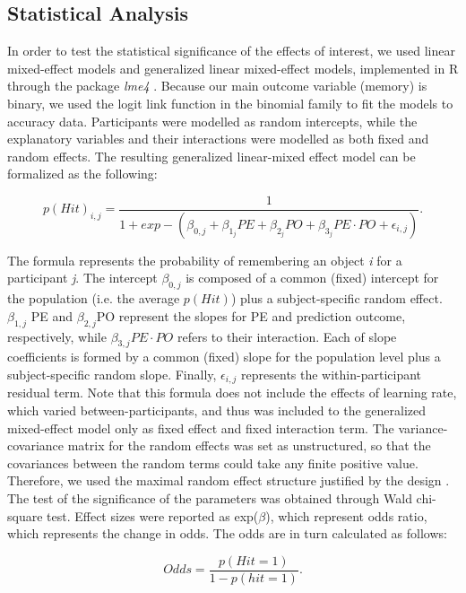 \documentclass[a4paper,12pt]{article}
\begin{document}
\subsection{Statistical Analysis}
In order to test the statistical significance of the effects of interest, we used linear mixed-effect models and generalized linear mixed-effect models, implemented in R through the package \textit{lme4} \citep{bates2014fitting}. Because our main outcome variable (memory) is binary, we used the logit link function in the binomial family to fit the models to accuracy data. Participants were modelled as random intercepts, while the explanatory variables and their interactions were modelled as both fixed and random effects. The resulting generalized linear-mixed effect model can be formalized as the following:

\begin{equation}
p(Hit)_{i,j} =   \dfrac{1}{1+exp - (\beta_{0,j} +\beta_{1_j} PE +\beta_{2_j} PO + \beta_{3_j} PE \cdot PO + \epsilon_{i,j} )}.
\end{equation}

\noindent
The formula represents the probability of remembering an object \textit{i} for a participant \textit{j}. The intercept $\beta_{0,j}$ is composed of a common (fixed) intercept for the population (i.e. the average $p(Hit)$) plus a subject-specific random effect. $\beta_{1,j}$ PE and $\beta_{2, j}$PO represent the slopes for PE and prediction outcome, respectively, while  $\beta_{3, j} PE \cdot PO$  refers to their interaction. Each of slope coefficients is formed by a common (fixed) slope for the population level plus a subject-specific random slope. Finally, $\epsilon_{i,j}$ represents the within-participant residual term. Note that this formula does not include the effects of learning rate, which varied between-participants, and thus was included to the generalized mixed-effect model only as fixed effect and fixed interaction term.  
The variance-covariance matrix for the random effects was set as unstructured, so that the covariances between the random terms could take any finite positive value.  Therefore, we used the maximal random effect structure justified by the design \citep{barr2013random}. The test of the significance of the parameters was obtained through Wald chi-square test. Effect sizes were reported as exp($\beta$), which represent odds ratio, which represents the change in odds. The odds are in turn calculated as follows:

\begin{equation}
Odds =   \dfrac{p(Hit=1)}{1-p(hit=1)}.
\end{equation}
\end{document}
